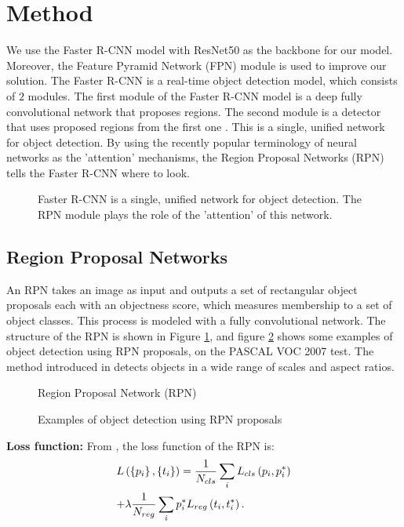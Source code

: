 \section{Method}
We use the Faster R-CNN model with ResNet50 as the backbone for our model. Moreover, the Feature Pyramid Network (FPN) module is used to improve our solution. The Faster R-CNN is a real-time object detection model, which consists of $2$ modules. The first module of the Faster R-CNN model is a deep fully convolutional network that proposes regions. The second module is a detector that uses proposed regions from the first one \cite{f-rcnn}. This is a single, unified network for object detection. By using the recently popular terminology of neural networks as the 'attention' mechanisms, the Region Proposal Networks (RPN) tells the Faster R-CNN where to look.

\begin{figure}[H]
\caption{Faster R-CNN is a single, unified network for object detection. The RPN module plays the role of the 'attention' of this network.}
\end{figure}

\subsection{Region Proposal Networks}
An RPN takes an image as input and outputs a set of rectangular object proposals each with an objectness score, which measures membership to a set of object classes. This process is modeled with a fully convolutional network. The structure of the RPN is shown in Figure \ref{rpn}, and figure \ref{rpn_example} shows some examples of object detection using RPN proposals, on the PASCAL VOC 2007 test. The method introduced in  \cite{f-rcnn} detects objects in a wide range of scales and aspect ratios.

\begin{figure}[H]
\caption{Region Proposal Network (RPN)}
\label{rpn}
\end{figure}

\begin{figure}[H]
\caption{Examples of object detection using RPN proposals}
\label{rpn_example}
\end{figure}

\textbf{Loss function:} From \cite{f-rcnn}, the loss function of the RPN is:
$$\begin{gathered}
L\left( {\left\{ {{p_i}} \right\},\left\{ {{t_i}} \right\}} \right) = \frac{1}{{{N_{cls}}}}\sum\limits_i {{L_{cls}}\left( {{p_i},p_i^*} \right)}  \hfill \\
 + \lambda \frac{1}{{{N_{reg}}}}\sum\limits_i {p_i^*} {L_{reg}}\left( {{t_i},t_i^*} \right). \hfill \\
\end{gathered} $$

